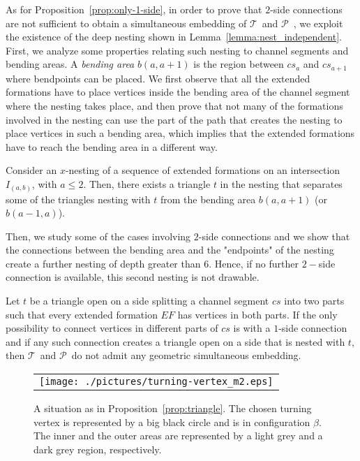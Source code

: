 \documentclass[a4paper,10pt]{llncs}
\newcounter{prop}
\newcommand{\T}{\mbox{$\mathcal T$ }}
\renewcommand{\P}{\mbox{$\mathcal P$ }}
\begin{document}
As for Proposition~\ref{prop:only-1-side}, in order to prove that $2$-side connections are not sufficient to obtain a simultaneous embedding of \T and \P, we exploit the existence of the deep nesting shown in Lemma~\ref{lemma:nest_independent}. First, we analyze some properties relating such nesting to channel segments and bending areas. A \emph{bending area} $b(a,a+1)$ is the region between $cs_a$ and $cs_{a+1}$ where bendpoints can be placed. We first observe that all the extended formations have to place vertices inside the bending area of the channel segment where the nesting takes place, and then prove that not many of the formations involved in the nesting can use the part of the path that creates the nesting to place vertices in such a bending area, which implies that the extended formations have to reach the bending area in a different way.

\begin{lemma}\label{lem:nesting-bending-area}
Consider an $x$-nesting of a sequence of extended formations on an intersection $I_{(a,b)}$, with $a\leq 2$.
Then, there exists a triangle $t$ in the nesting that separates some of the triangles nesting with $t$ from the bending area $b(a,a+1)$ (or $b(a-1,a)$).
\end{lemma}

Then, we study some of the cases involving $2$-side connections and we show that the connections between the bending area and the "endpoints" of the nesting create a further nesting of depth greater than $6$. Hence, if no further $2-$side connection is available, this second nesting is not drawable.

\begin{proposition}\label{prop:triangle}
Let $t$ be a triangle open on a side splitting a channel segment $cs$ into two parts such that every extended formation $EF$ has vertices in both parts. If the only possibility to connect vertices in different parts of $cs$ is with a $1$-side connection and if any such connection creates a triangle open on a side that is nested with $t$, then \T and \P do not admit any geometric simultaneous embedding.
\end{proposition}

\begin{figure}[htb]
\begin{center}
\begin{tabular}{c}
\mbox{\texttt{[image: ./pictures/turning-vertex\_m2.eps]}} \hspace{0.2cm}
\end{tabular}
\caption{A situation as in Proposition~\ref{prop:triangle}. The chosen turning vertex is represented by a big black circle and is in configuration $\beta$. The inner and the outer areas are represented by a light grey and a dark grey region, respectively.}
\label{fig:turning-vertex}
\end{center}
\end{figure}
\end{document}
